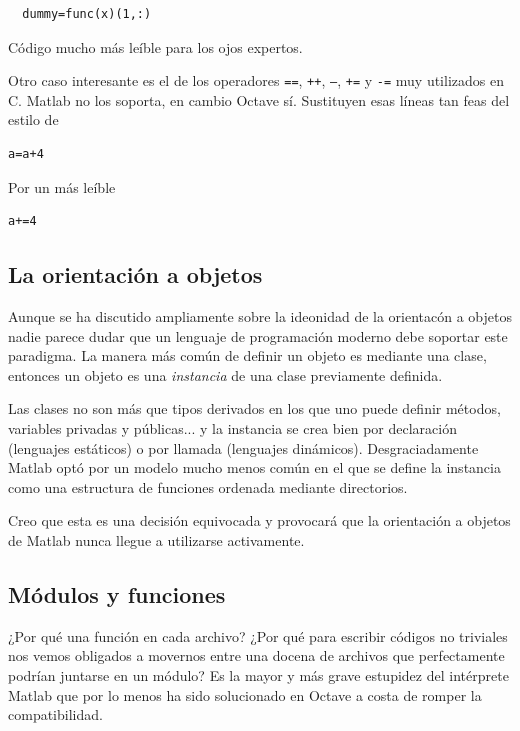\begin{lstlisting}
  dummy=func(x)(1,:)
\end{lstlisting}

Código mucho más leíble para los ojos expertos.

Otro caso interesante es el de los operadores \texttt{==},
\texttt{++}, \texttt{--}, \texttt{+=} y \texttt{-=} muy utilizados en
C.  Matlab no los soporta, en cambio Octave sí. Sustituyen esas líneas tan
feas del estilo de 

\begin{lstlisting}
a=a+4
\end{lstlisting}

Por un más leíble

\begin{lstlisting}
a+=4
\end{lstlisting}


\subsection{La orientación a objetos}

Aunque se ha discutido ampliamente sobre la ideonidad de la orientacón
a objetos nadie parece dudar que un lenguaje de programación moderno
debe soportar este paradigma. La manera más común de definir un objeto
es mediante una clase, entonces un objeto es una \emph{instancia} de
una clase previamente definida.

Las clases no son más que tipos derivados en los que uno puede definir
métodos, variables privadas y públicas... y la instancia se crea bien
por declaración (lenguajes estáticos) o por llamada (lenguajes
dinámicos).  Desgraciadamente Matlab optó por un modelo mucho menos
común en el que se define la instancia como una estructura de
funciones ordenada mediante directorios.

Creo que esta es una decisión equivocada y provocará que la
orientación a objetos de Matlab nunca llegue a utilizarse activamente.

\subsection{Módulos y funciones}

¿Por qué una función en cada archivo? ¿Por qué para escribir códigos
no triviales nos vemos obligados a movernos entre una docena de
archivos que perfectamente podrían juntarse en un módulo?  Es la mayor
y más grave estupidez del intérprete Matlab que por lo menos ha sido
solucionado en Octave a costa de romper la compatibilidad.

